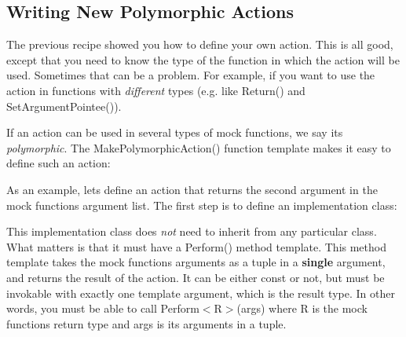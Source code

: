 \subsection*{Writing New Polymorphic Actions}

The previous recipe showed you how to define your own action. This is all good, except that you need to know the type of the function in which the action will be used. Sometimes that can be a problem. For example, if you want to use the action in functions with {\itshape different} types (e.\+g. like {\ttfamily Return()} and {\ttfamily Set\+Argument\+Pointee()}).

If an action can be used in several types of mock functions, we say it\textquotesingle{}s {\itshape polymorphic}. The {\ttfamily Make\+Polymorphic\+Action()} function template makes it easy to define such an action\+:


\begin{DoxyCode}{0}
\DoxyCodeLine{}
\DoxyCodeLine{}
\end{DoxyCode}


As an example, let\textquotesingle{}s define an action that returns the second argument in the mock function\textquotesingle{}s argument list. The first step is to define an implementation class\+:


\begin{DoxyCode}{0}
\DoxyCodeLine{  \}}
\DoxyCodeLine{\};}
\end{DoxyCode}


This implementation class does {\itshape not} need to inherit from any particular class. What matters is that it must have a {\ttfamily Perform()} method template. This method template takes the mock function\textquotesingle{}s arguments as a tuple in a {\bfseries{single}} argument, and returns the result of the action. It can be either {\ttfamily const} or not, but must be invokable with exactly one template argument, which is the result type. In other words, you must be able to call {\ttfamily Perform$<$R$>$(args)} where {\ttfamily R} is the mock function\textquotesingle{}s return type and {\ttfamily args} is its arguments in a tuple.

